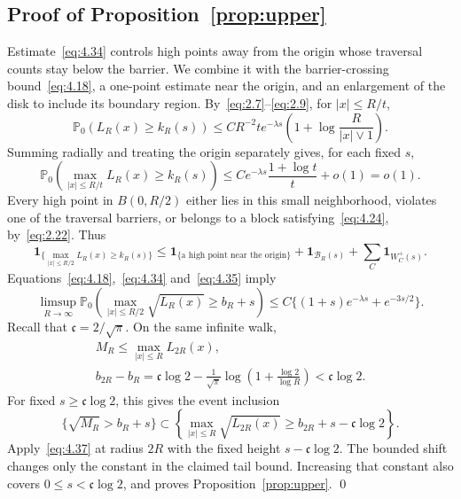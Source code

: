 \documentclass[11pt,letterpaper,reqno]{amsart}
\numberwithin{equation}{section}
\theoremstyle{remark}
\begin{document}
\subsection{Proof of Proposition~\ref{prop:upper}}\label{sec:uppercompletion}
Estimate~\eqref{eq:4.34} controls high points away from the origin whose traversal counts stay below the barrier. We combine it with the barrier-crossing bound~\eqref{eq:4.18}, a one-point estimate near the origin, and an enlargement of the disk to include its boundary region. By~\eqref{eq:2.7}--\eqref{eq:2.9}, for $|x|\le R/t$,
\[
\mathbb P_0(L_R(x)\ge k_R(s))
\le CR^{-2}t e^{-\lambda s}
\left(1+\log\frac R{|x|\vee1}\right).
\]
Summing radially and treating the origin separately gives, for each fixed $s$,
\begin{equation}\label{eq:4.35}
\mathbb P_0\left(\max_{|x|\le R/t}L_R(x)\ge k_R(s)\right)
\le Ce^{-\lambda s}\frac{1+\log t}{t}+o(1)=o(1).
\end{equation}
Every high point in $B(0,R/2)$ either lies in this small neighborhood, violates one of the traversal barriers, or belongs to a block satisfying~\eqref{eq:4.24}, by~\eqref{eq:2.22}. Thus
\begin{equation}\label{eq:4.36}
\mathbf1_{\{\max_{|x|\le R/2}L_R(x)\ge k_R(s)\}}
\le\mathbf1_{\{\text{a high point near the origin}\}}+\mathbf1_{\mathcal B_R(s)}
+\sum_C\mathbf1_{W_C^+(s)}.
\end{equation}
Equations~\eqref{eq:4.18},~\eqref{eq:4.34} and~\eqref{eq:4.35} imply
\begin{equation}\label{eq:4.37}
\limsup_{R\to\infty}\mathbb P_0\left(\max_{|x|\le R/2}\sqrt{L_R(x)}\ge b_R+s\right)
\le C\{(1+s)e^{-\lambda s}+e^{-3s/2}\}.
\end{equation}
Recall that $\mathfrak c=2/\sqrt\pi$. On the same infinite walk,
\[
\begin{gathered}
M_R\le\max_{|x|\le R}L_{2R}(x),\\
b_{2R}-b_R
=\mathfrak c\log2-\frac1{\sqrt\pi}
 \log\left(1+\frac{\log2}{\log R}\right)
<\mathfrak c\log2.
\end{gathered}
\]
For fixed $s\ge\mathfrak c\log2$, this gives the event inclusion
\[
\{\sqrt{M_R}>b_R+s\}
\subset
\left\{\max_{|x|\le R}\sqrt{L_{2R}(x)}
\ge b_{2R}+s-\mathfrak c\log2\right\}.
\]
Apply~\eqref{eq:4.37} at radius $2R$ with the fixed height
$s-\mathfrak c\log2$. The bounded shift changes only the constant in the claimed tail bound. Increasing that constant also covers
$0\le s<\mathfrak c\log2$, and proves Proposition~\ref{prop:upper}.
\qed
\end{document}
